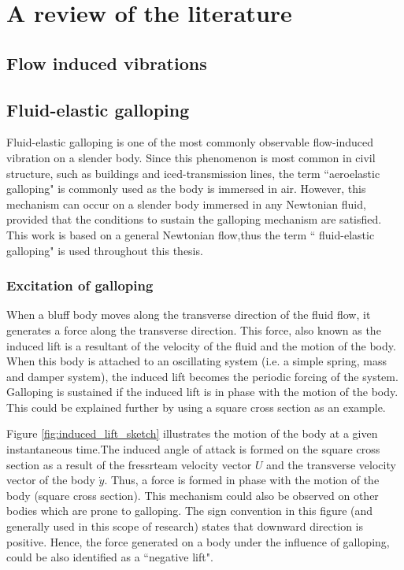 \chapter{A review of the literature}

\section{Flow induced vibrations}


\section{Fluid-elastic galloping}

Fluid-elastic galloping is one of the most commonly observable flow-induced vibration on a slender body. Since this phenomenon is most common in civil structure, such as buildings and iced-transmission lines, the term ``aeroelastic galloping" is commonly used as the body is immersed in air. However, this mechanism can occur on a slender body immersed in any Newtonian fluid, provided that the conditions to sustain the galloping mechanism are satisfied. This work is based on a general Newtonian flow,thus the term `` fluid-elastic galloping" is used throughout this thesis.
   

\subsection{Excitation of galloping}

When a bluff body moves along the transverse direction of the fluid flow, it generates a force along the transverse direction. This force, also known as the induced lift is a resultant of the velocity of the fluid and the motion of the body. When this body is attached to an oscillating system (i.e. a simple spring, mass and damper system), the induced lift becomes the periodic forcing of the system. Galloping is sustained  if the induced lift is in phase with the motion of the body. This could be explained further by using a square cross section as an example.



 Figure \ref{fig:induced_lift_sketch}  illustrates the motion of the body at a given instantaneous time.The induced angle of attack is formed on the square cross section as a result of the fressrteam velocity vector $U$ and the transverse velocity vector of the body $\dot{y}$. Thus, a force is formed in phase with the motion of the body (square cross section). This mechanism could also be observed on other bodies which are prone to galloping. The sign convention in this figure (and generally used in this scope of research) states that downward direction is positive. Hence, the force generated on a body under the influence of galloping, could be also identified as a ``negative lift".
 

